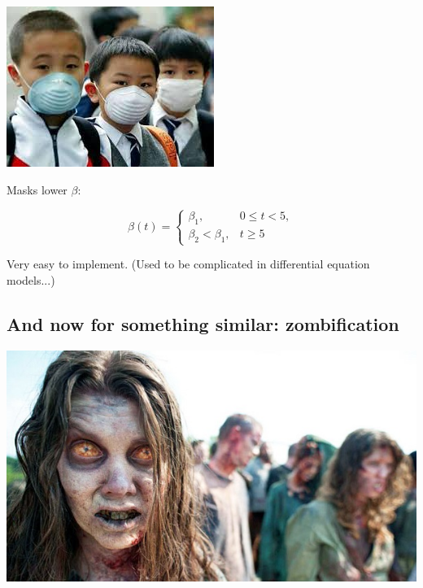 \documentclass[%
twoside,                 %
final,                   %
10pt]{article}
\begin{document}

\begin{center}  %
  \centerline{\includegraphics[width=0.9\linewidth]{fig/disease2.jpg}}
\end{center}


Masks lower $\beta$:

\begin{equation*} \beta(t) = \left\lbrace\begin{array}{ll}
\beta_1,& 0\leq t < 5,\\
\beta_2 < \beta_1,& t \geq 5\end{array}\right.
\end{equation*}

Very easy to implement. (Used to be complicated in differential
equation models...)

\subsection{And now for something similar: zombification}



\begin{center}  %
  \centerline{\includegraphics[width=0.9\linewidth]{fig/zombie1.jpg}}
\end{center}
\end{document}
